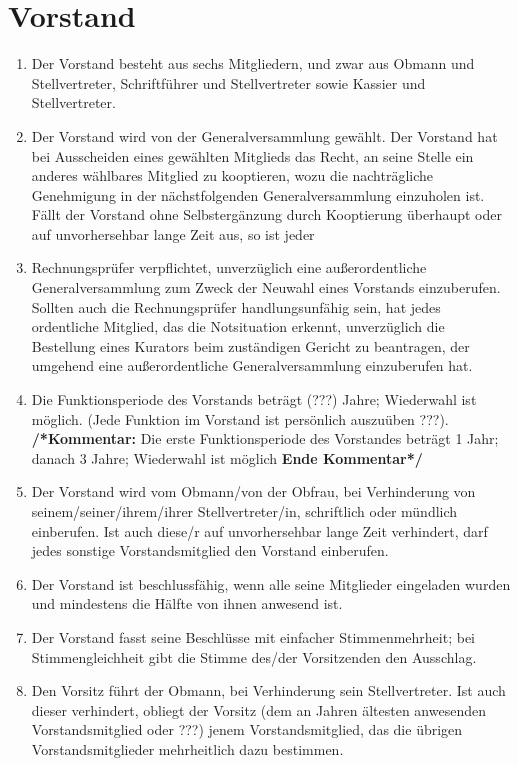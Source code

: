 \documentclass[a4paper,12pt]{article}
\newcommand{\comment}[1]{{\newline \bf /*Kommentar:} #1 {\bf Ende Kommentar*/}}
\begin{document}
\section{Vorstand} %
\begin{enumerate}
\item Der Vorstand besteht aus sechs Mitgliedern, und zwar aus Obmann und Stellvertreter, Schriftführer und Stellvertreter sowie Kassier und Stellvertreter.
\item Der Vorstand wird von der Generalversammlung gewählt. Der Vorstand hat bei Ausscheiden eines gewählten Mitglieds das Recht, an seine Stelle ein anderes wählbares Mitglied zu kooptieren, wozu die nachträgliche Genehmigung in der nächstfolgenden Generalversammlung einzuholen ist. Fällt der Vorstand ohne Selbstergänzung durch Kooptierung überhaupt oder auf unvorhersehbar lange Zeit aus, so ist jeder \item Rechnungsprüfer verpflichtet, unverzüglich eine außerordentliche Generalversammlung zum Zweck der Neuwahl eines Vorstands einzuberufen. Sollten auch die Rechnungsprüfer handlungsunfähig sein, hat jedes ordentliche Mitglied, das die Notsituation erkennt, unverzüglich die Bestellung eines Kurators beim zuständigen Gericht zu beantragen, der umgehend eine außerordentliche Generalversammlung einzuberufen hat.
\item Die Funktionsperiode des Vorstands beträgt (???) Jahre; Wiederwahl ist möglich. (Jede Funktion im Vorstand ist persönlich auszuüben ???).
\comment{Die erste Funktionsperiode des Vorstandes betr\"agt 1 Jahr; danach 3 Jahre; Wiederwahl ist m\"oglich}
\item Der Vorstand wird vom Obmann/von der Obfrau, bei Verhinderung von seinem/seiner/ihrem/ihrer Stellvertreter/in, schriftlich oder mündlich einberufen. Ist auch diese/r auf unvorhersehbar lange Zeit verhindert, darf jedes sonstige Vorstandsmitglied den Vorstand einberufen.
\item Der Vorstand ist beschlussfähig, wenn alle seine Mitglieder eingeladen wurden und mindestens die Hälfte von ihnen anwesend ist.
\item Der Vorstand fasst seine Beschlüsse mit einfacher Stimmenmehrheit; bei Stimmengleichheit gibt die Stimme des/der Vorsitzenden den Ausschlag.
\item Den Vorsitz führt der Obmann, bei Verhinderung sein Stellvertreter. Ist auch dieser verhindert, obliegt der Vorsitz (dem an Jahren ältesten anwesenden Vorstandsmitglied oder ???) jenem Vorstandsmitglied, das die übrigen Vorstandsmitglieder mehrheitlich dazu bestimmen.

\end{enumerate}
\end{document}
